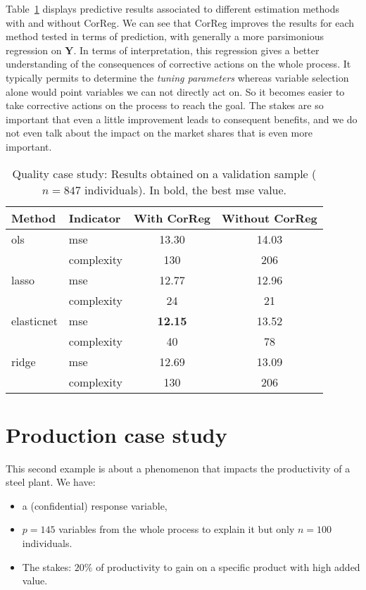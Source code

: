\documentclass[12pt,a4paper]{report}
\begin{document}
\vspace{3mm}
	
	
Table~\ref{Res_exfos} displays predictive results associated to different estimation methods with and without {\sc CorReg}. We can see that {\sc CorReg} improves the results for each method tested in terms of prediction, with generally a more parsimonious regression on $\boldsymbol{Y}$. In terms of interpretation, this regression gives a better understanding of the consequences of corrective actions on the whole process. It typically permits to determine the \textit{tuning parameters} whereas variable selection alone would point variables we can not directly act on.	So it becomes easier to take corrective actions on the process to reach the goal. The stakes are so important that even a little improvement leads to consequent benefits, and we do not even talk about the impact on the market shares that is even more important.
		

		\begin{table}[h!]
\centering
\begin{tabular}{llcc}
	\hline
	Method& Indicator& With {\sc CorReg} & Without {\sc CorReg} \\ 
	\hline \hline
	{\sc ols} & {\sc mse} & 13.30 & 14.03 \\
		& complexity& 130 & 206 \\
	\hline
	{\sc lasso} & {\sc mse} & 12.77 & 12.96 \\
		& complexity& 24 & 21 \\
	\hline
	elasticnet & {\sc mse} & \textbf{12.15} & 13.52 \\
		& complexity& 40 & 78 \\
	\hline
	ridge & {\sc mse} & 12.69 & 13.09 \\
		& complexity& 130 & 206 \\
	\hline
\end{tabular} 
\caption{Quality case study: Results obtained on a validation sample ($n=847$ individuals). In bold, the best {\sc mse} value.}\label{Res_exfos}
\end{table}


		\FloatBarrier
		\section{Production case study}\label{sectionBV}
This second example is about a phenomenon that impacts the productivity of a steel plant.
We have:
		\begin{itemize}
			\item a (confidential)  response variable,
			\item $p=145$ variables from the whole process to explain it but only $n=100$ individuals.
			\item The stakes: $20\%$ of productivity to gain on a specific product with high added value.
		\end{itemize}
		
\end{document}
